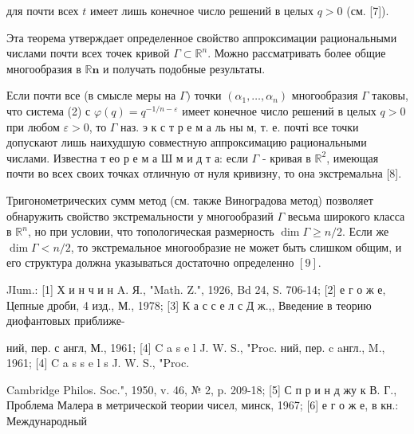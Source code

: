\documentclass[10pt]{article}
\begin{document}
для почти всех $t$ имеет лишь конечное число решений в целых $q>0$ (см. [7]).



Эта теорема утверждает определенное свойство аппроксимации рациональными числами почти всех точек кривой $\Gamma \subset \mathbb{R}^{n}$. Можно рассматривать более общие многообразия в $\mathbb{R} \boldsymbol{n}$ и получать подобные результаты.



Если почти все (в смысле меры на $\Gamma)$ точки $\left(\alpha_{1}, \ldots, \alpha_{n}\right)$ многообразия $\Gamma$ таковы, что система (2) с $\varphi(q)=q^{-1 / n-\varepsilon}$ имеет конечное число решений в целых $q>0$ при любом $\varepsilon>0$, то $\Gamma$ наз. э к с т р е м а ль ны м, т. е. почті все точки допускают лишь наихудшую совместную аппроксимацию рациональными числами. Известна т ео р е м а Ш м и д т а: если $\Gamma$ - кривая в $\mathbb{R}^{2}$, имеющая почти во всех своих точках отличную от нуля кривизну, то она экстремальна [8].



Тригонометрических сумм метод (см. также Виноградова метод) позволяет обнаружить свойство экстремальности у многообразий $\Gamma$ весьма широкого класса в $\mathbb{R}^{n}$, но при условии, что топологическая размерность $\operatorname{dim} \Gamma \geqslant n / 2$. Если же $\operatorname{dim} \Gamma<n / 2$, то экстремальное многообразие не может быть слишком общим, и его структура должна указываться достаточно определенно $[9]$.



JIum.: [1] Х и н ч и н A. Я., "Math. Z.", 1926, Bd 24, S. 706-14; [2] е г о ж е, Цепные дроби, 4 изд., М., 1978; [3] К а с с е л с Д ж.,, Введение в теорию диофантовых приближе-

ний, пер. с англ, М., 1961; [4] C a s e l J. W. S., "Proc. ний, пер. c aнгл., M., 1961; [4] C a s s e l s J. W. S., "Proc.

Cambridge Philos. Soc.", 1950, v. 46, № 2, p. 209-18; [5] С п р и н д жу к В. Г., Проблема Малера в метрической теории чисел, минск, 1967; [6] е г о ж е, в кн.: Международный
\end{document}
